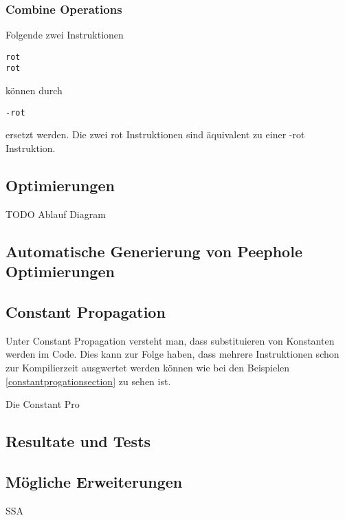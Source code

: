 \subsubsection{Combine Operations}
Folgende zwei Instruktionen
%
\begin{verbatim}
rot
rot
\end{verbatim}
%
können durch
%
\begin{verbatim}
-rot
\end{verbatim}
%
ersetzt werden. Die zwei rot Instruktionen sind äquivalent zu einer -rot Instruktion.
\subsection{Optimierungen}

TODO Ablauf Diagram

\subsection{Automatische Generierung von Peephole Optimierungen}

\subsection{Constant Propagation}
Unter Constant Propagation versteht man, dass substituieren von Konstanten werden im Code. Dies kann zur Folge haben, dass mehrere Instruktionen schon zur Kompilierzeit ausgwertet werden können wie bei den Beispielen \ref{constantprogationsection} zu sehen ist.

Die Constant Pro
\subsection{Resultate und Tests}


\subsection{Mögliche Erweiterungen}
SSA